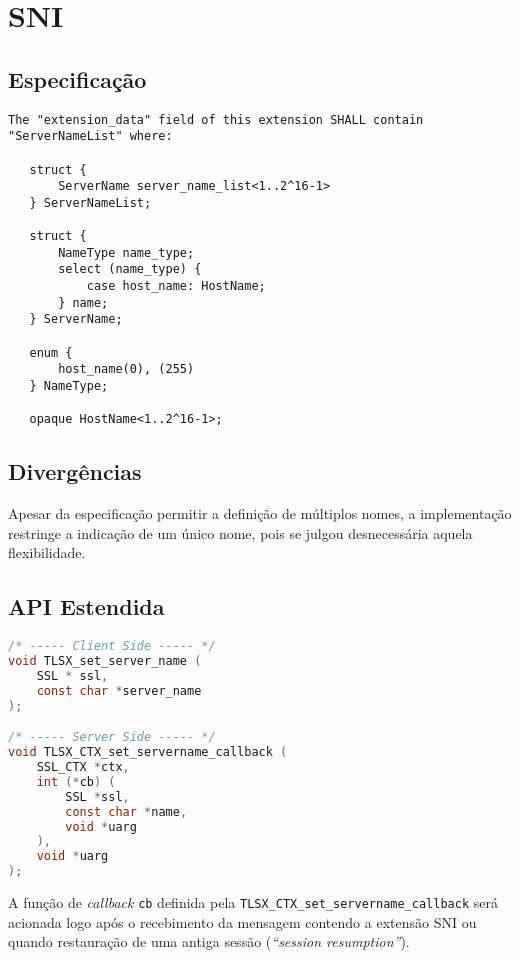 \section{\acl{SNI}}

\subsection{Especificação}

\begin{lstlisting}[caption={RFC 3546, trecho da seção 3.1}]
The "extension_data" field of this extension SHALL contain    
"ServerNameList" where: 
 
   struct { 
       ServerName server_name_list<1..2^16-1> 
   } ServerNameList; 
 
   struct { 
       NameType name_type; 
       select (name_type) { 
           case host_name: HostName; 
       } name; 
   } ServerName; 
 
   enum { 
       host_name(0), (255) 
   } NameType; 
 
   opaque HostName<1..2^16-1>;
\end{lstlisting}

\subsection{Divergências}

Apesar da especificação permitir a definição de múltiplos nomes, a 
implementação restringe a indicação de um único nome, pois se julgou 
desnecessária aquela flexibilidade.

\subsection{API Estendida}

\begin{lstlisting}[language=C,%
		    emph={TLSX_set_server_name,TLSX_CTX_set_servername_callback},%
		    caption=API para a extensão \acs{SNI}]
/* ----- Client Side ----- */
void TLSX_set_server_name (
	SSL * ssl,
	const char *server_name 
);

/* ----- Server Side ----- */
void TLSX_CTX_set_servername_callback (
	SSL_CTX *ctx,
	int (*cb) (
		SSL *ssl,
		const char *name,
		void *uarg
	),
	void *uarg
);
\end{lstlisting}

A função de \emph{callback} \verb|cb| definida pela \verb|TLSX_CTX_set_servername_callback|
será acionada logo após o recebimento da mensagem \tlsHsCh contendo a 
extensão \acl{SNI} ou quando restauração de uma antiga sessão 
(\emph{``session resumption''}).

